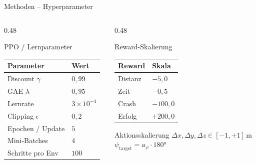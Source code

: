 \begin{frame}{Methoden -- Hyperparameter}
\begin{columns}[T]
\begin{column}{0.48\textwidth}
  \begin{block}{PPO / Lernparameter}
    \renewcommand{\arraystretch}{1.2}
    \begin{tabular}{ll}
      \hline
      \textbf{Parameter}       & \textbf{Wert} \\
      \hline
      Discount $\gamma$        & $0{,}99$ \\
      GAE $\lambda$            & $0{,}95$ \\
      Lernrate                 & $3 \times 10^{-4}$ \\
      Clipping $\epsilon$      & $0{,}2$ \\
      Epochen / Update         & $5$ \\
      Mini-Batches             & $4$ \\
      Schritte pro Env         & $100$ \\
      \hline
    \end{tabular}
  \end{block}
\end{column}
\begin{column}{0.48\textwidth}
  \begin{exampleblock}{Reward-Skalierung}
    \begin{tabular}{ll}
      \hline
      \textbf{Reward} & \textbf{Skala} \\
      \hline
      Distanz  & $-5{,}0$ \\
      Zeit     & $-0{,}5$ \\
      Crash    & $-100{,}0$ \\
      Erfolg   & $+200{,}0$ \\
      \hline
    \end{tabular}
  \end{exampleblock}
  \begin{exampleblock}{Aktionsskalierung}
    $\Delta x, \Delta y, \Delta z \in [-1, +1]\,$m\\
    $\psi_\text{target} = a_\psi \cdot 180°$
  \end{exampleblock}
\end{column}
\end{columns}
\end{frame}


